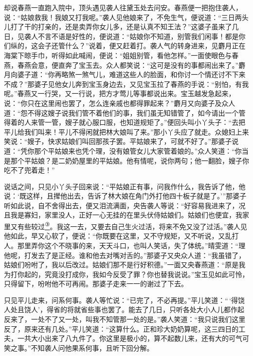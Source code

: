 却说春燕一直跑入院中，顶头遇见袭人往黛玉处去问安。春燕便一把抱住袭人，说：``姑娘救我！我娘又打我呢。''袭人见他娘来了，不免生气，便说道：``三日两头儿打了干的打亲的，还是卖弄你女儿多，还是认真不知王法？''这婆子虽来了几日，见袭人不言不语是好性的，便说道：``姑娘你不知道，别管我们闲事！都是你们纵的，这会子还管什么？''说着，便又赶着打。袭人气的转身进来，见麝月正在海棠下晾手巾，听得如此喊闹，便说：``姐姐别管，看他怎样。''一面使眼色与春燕，春燕会意，便直奔了宝玉去。众人都笑说：``这可是没有的事都闹出来了。''麝月向婆子道：``你再略煞一煞气儿，难道这些人的脸面，和你讨一个情还讨不下来不成？''那婆子见他女儿奔到宝玉身边去，又见宝玉拉了春燕的手说：``别怕，有我呢。''春燕又一行哭，又一行说，把方才莺儿等事都说出来。宝玉越发急起来，说：``你只在这里闹也罢了，怎么连亲戚也都得罪起来？''麝月又向婆子及众人道：``怨不得这嫂子说我们管不着他们的事，我们虽无知错管了，如今请出一个管得着的人来管一管，嫂子就心服口服，也知道规矩了。''便回头叫小丫头子：``去把平儿给我们叫来！平儿不得闲就把林大娘叫了来。''那小丫头应了就走。众媳妇上来笑说：``嫂子，快求姑娘们叫回那孩子罢。平姑娘来了，可就不好了。''那婆子说道：``凭你那个平姑娘来也凭个理，没有娘管女儿大家管着娘的。''众人笑道：``你当是那个平姑娘？是二奶奶屋里的平姑娘。他有情呢，说你两句；他一翻脸，嫂子你吃不了兜着走！''

说话之间，只见小丫头子回来说：``平姑娘正有事，问我作什么，我告诉了他，他说：`既这样，且撵他出去，告诉了林大娘在角门外打他四十板子就是了。'''那婆子听如此说，自不舍得出去，便又泪流满面，央告袭人等说：``好容易我进来了，况且我是寡妇，家里没人，正好一心无挂的在里头伏侍姑娘们。姑娘们也便宜，我家里又有些较过\href{../Text/part0063_split_000.html\#lnkback_3_a}{\textsuperscript{③}}。我这一去，又要去自己生火过活，将来不免又没了过活。''袭人见他如此，早又心软了，便说：``你既要在这里，又不守规矩，又不听说，又乱打人。那里弄你这个不晓事的来，天天斗口，也叫人笑话，失了体统。''晴雯道：``理他呢，打发去了是正经。谁和他去对嘴对舌的。''那婆子又央众人道：``我虽错了，姑娘们吩咐了，我以后改过。姑娘们那不是行好积德。''一面又央春燕道：``原是我为打你起的，究竟没打成你，我如今反受了罪？你也替我说说。''宝玉见如此可怜，只得留下，吩咐他不可再闹。那婆子走来一一的谢过了下去。

只见平儿走来，问系何事。袭人等忙说：``已完了，不必再提。''平儿笑道：``\,`得饶人处且饶人'，得省的将就省些事也罢了。能去了几日，只听各处大小人儿都作起反来了，一处不了又一处，叫我不知管那一处的是。''袭人笑道：``我只说我们这里反了，原来还有几处。''平儿笑道：``这算什么。正和珍大奶奶算呢，这三四日的工夫，一共大小出来了八九件了。你这里是极小的，算不起数儿来，还有大的可气可笑之事。''不知袭人问他果系何事，且听下回分解。

